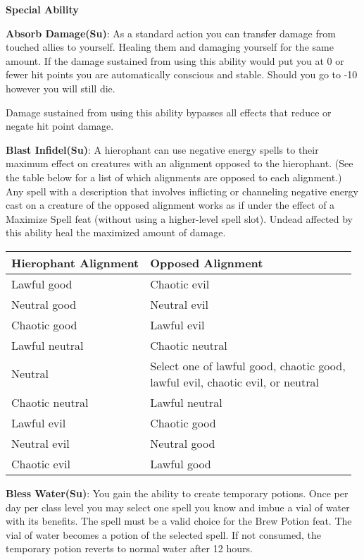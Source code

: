 \textbf{\large{Special Ability}}

\textbf{Absorb Damage(Su)}: As a standard action you can transfer damage from touched allies to yourself. Healing them and damaging yourself for the same amount. If the damage sustained from using this ability would put you at 0 or fewer hit points you are automatically conscious and stable. Should you go to -10 however you will still die.

Damage sustained from using this ability bypasses all effects that reduce or negate hit point damage.

\textbf{Blast Infidel(Su)}: A hierophant can use negative energy spells to their maximum effect on creatures with an alignment opposed to the hierophant. (See the table below for a list of which alignments are opposed to each alignment.) Any spell with a description that involves inflicting or channeling negative energy cast on a creature of the opposed alignment works as if under the effect of a Maximize Spell feat (without using a higher-level spell slot). Undead affected by this ability heal the maximized amount of damage. 

\begin{center}
\begin{adjustwidth}{-4cm}{}
\begin{small}
\begin{tabular}{| l | l |}
\hline
Hierophant Alignment &Opposed Alignment \\
\hline
Lawful good &Chaotic evil \\
Neutral good &Neutral evil \\
Chaotic good &Lawful evil \\
Lawful neutral &Chaotic neutral \\
Neutral &\makecell{Select one of lawful good, chaotic good,\\ lawful evil, chaotic evil, or neutral} \\
Chaotic neutral &Lawful neutral \\
Lawful evil &Chaotic good \\
Neutral evil &Neutral good \\
Chaotic evil &Lawful good \\
\hline
\end{tabular}
\end{small}
\end{adjustwidth}
\end{center}

\textbf{Bless Water(Su)}: You gain the ability to create temporary potions. Once per day per class level you may select one spell you know and imbue a vial of water with its benefits. The spell must be a valid choice for the Brew Potion feat. The vial of water becomes a potion of the selected spell. If not consumed, the temporary potion reverts to normal water after 12 hours.

